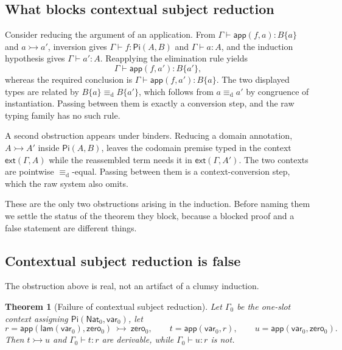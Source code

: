 \documentclass[10pt,reqno]{amsart}
\newtheorem{theorem}{Theorem}[section]
\newcommand{\Ext}[2]{\mathsf{ext}(#1,#2)}
\newcommand{\Var}{\mathsf{var}}
\newcommand{\PiTy}{\mathsf{Pi}}
\newcommand{\Lam}{\mathsf{lam}}
\newcommand{\App}{\mathsf{app}}
\newcommand{\NatTy}{\mathsf{Nat}}
\newcommand{\Zero}{\mathsf{zero}}
\newcommand{\defeq}{\mathrel{\equiv_{\mathrm d}}}
\newcommand{\ctxred}{\mathrel{\rightarrowtail}}
\begin{document}
\subsection{What blocks contextual subject reduction}

Consider reducing the argument of an application.  From
\(\Gamma\vdash\App(f,a):B\{a\}\) and \(a\ctxred a'\), inversion gives
\(\Gamma\vdash f:\PiTy(A,B)\) and \(\Gamma\vdash a:A\), and the induction
hypothesis gives \(\Gamma\vdash a':A\).  Reapplying the elimination rule yields
\[
 \Gamma\vdash\App(f,a'):B\{a'\},
\]
whereas the required conclusion is \(\Gamma\vdash\App(f,a'):B\{a\}\).  The two
displayed types are related by \(B\{a\}\defeq B\{a'\}\), which follows from
\(a\defeq a'\) by congruence of instantiation.  Passing between them is
exactly a conversion step, and the raw typing family has no such rule.

A second obstruction appears under binders.  Reducing a domain annotation,
\(A\ctxred A'\) inside \(\PiTy(A,B)\), leaves the codomain premise typed in the
context \(\Ext{\Gamma}{A}\) while the reassembled term needs it in
\(\Ext{\Gamma}{A'}\).  The two contexts are pointwise \(\defeq\)-equal.
Passing between them is a context-conversion step, which the raw system also
omits.

These are the only two obstructions arising in the induction.  Before naming
them we settle the status of the theorem they block, because a blocked proof and
a false statement are different things.

\subsection{Contextual subject reduction is false}
\label{subsec:sr-fails}

The obstruction above is real, not an artifact of a clumsy induction.

\begin{theorem}[Failure of contextual subject reduction]
\label{thm:sr-fails}
Let \(\Gamma_0\) be the one-slot context assigning
\(\PiTy(\NatTy_0,\Var_0)\), let
\[
 r=\App(\Lam(\Var_0),\Zero_0)\ \ctxred\ \Zero_0,
 \qquad
 t=\App(\Var_0,r),
 \qquad
 u=\App(\Var_0,\Zero_0).
\tag{6.1}\label{eq:sr-counterexample}
\]
Then \(t\ctxred u\) and \(\Gamma_0\vdash t:r\) are derivable, while
\(\Gamma_0\vdash u:r\) is not.
\end{theorem}
\end{document}
